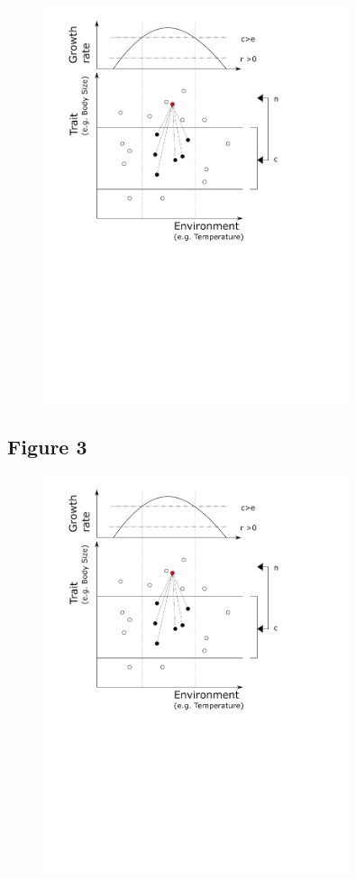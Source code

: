 \documentclass[12pt]{article}
\begin{document}
\begin{figure}[ht!]
	\centering\includegraphics[width=0.8\textwidth]{niche}
\end{figure}

\newpage

\subsection*{Figure 3}

\begin{figure}[ht!]
	\centering\includegraphics[width=0.8\textwidth]{niche}
\end{figure}
\end{document}
